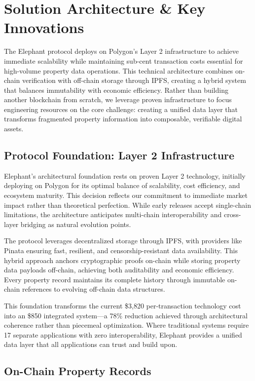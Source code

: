 \chapter{Solution Architecture \& Key Innovations}

The Elephant protocol deploys on Polygon's Layer 2 infrastructure to achieve immediate scalability while maintaining sub-cent transaction costs essential for high-volume property data operations. This technical architecture combines on-chain verification with off-chain storage through IPFS, creating a hybrid system that balances immutability with economic efficiency. Rather than building another blockchain from scratch, we leverage proven infrastructure to focus engineering resources on the core challenge: creating a unified data layer that transforms fragmented property information into composable, verifiable digital assets.

\section{Protocol Foundation: Layer 2 Infrastructure}

Elephant's architectural foundation rests on proven Layer 2 technology, initially deploying on Polygon for its optimal balance of scalability, cost efficiency, and ecosystem maturity. This decision reflects our commitment to immediate market impact rather than theoretical perfection. While early releases accept single-chain limitations, the architecture anticipates multi-chain interoperability and cross-layer bridging as natural evolution points.

The protocol leverages decentralized storage through IPFS, with providers like Pinata ensuring fast, resilient, and censorship-resistant data availability. This hybrid approach anchors cryptographic proofs on-chain while storing property data payloads off-chain, achieving both auditability and economic efficiency. Every property record maintains its complete history through immutable on-chain references to evolving off-chain data structures.

This foundation transforms the current \$3,820 per-transaction technology cost into an \$850 integrated system—a 78\% reduction achieved through architectural coherence rather than piecemeal optimization. Where traditional systems require 17 separate applications with zero interoperability, Elephant provides a unified data layer that all applications can trust and build upon.

\section{On-Chain Property Records}

